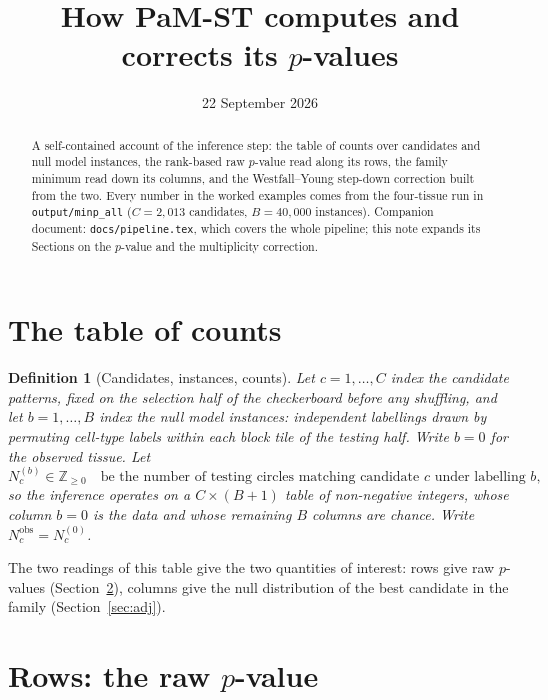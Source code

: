 \documentclass[11pt,a4paper]{article}
\title{How PaM-ST computes and corrects its $p$-values}
\author{}
\date{22 September 2026}
\newtheorem{definition}{Definition}[section]
\theoremstyle{remark}
\newcommand{\obs}{\mathrm{obs}}
\begin{document}
\maketitle

\begin{abstract}
A self-contained account of the inference step: the table of counts over
candidates and null model instances, the rank-based raw $p$-value read along
its rows, the family minimum read down its columns, and the Westfall--Young
step-down correction built from the two. Every number in the worked examples
comes from the four-tissue run in \texttt{output/minp\_all}
($C=2{,}013$ candidates, $B=40{,}000$ instances). Companion document:
\texttt{docs/pipeline.tex}, which covers the whole pipeline; this note expands
its Sections on the $p$-value and the multiplicity correction.
\end{abstract}

\section{The table of counts}

\begin{definition}[Candidates, instances, counts]
\label{def:table}
Let $c=1,\dots,C$ index the candidate patterns, fixed on the selection half of
the checkerboard before any shuffling, and let $b=1,\dots,B$ index the null
model instances: independent labellings drawn by permuting cell-type labels
within each block tile of the testing half. Write $b=0$ for the observed
tissue. Let
\[
  N_c^{(b)}\in\mathbb{Z}_{\ge0}
  \quad\text{be the number of testing circles matching candidate $c$ under labelling $b$,}
\]
so the inference operates on a $C\times(B+1)$ table of non-negative integers,
whose column $b=0$ is the data and whose remaining $B$ columns are chance.
Write $N_c^{\obs}=N_c^{(0)}$.
\end{definition}

The two readings of this table give the two quantities of interest: rows give
raw $p$-values (Section~\ref{sec:raw}), columns give the null distribution of
the best candidate in the family (Section~\ref{sec:adj}).

\section{Rows: the raw \texorpdfstring{$p$}{p}-value}
\label{sec:raw}
\end{document}
